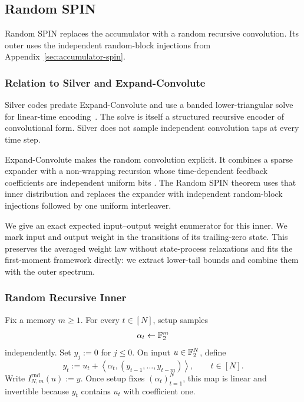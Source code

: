 \subsection{Random SPIN}
\label{sec:random-spin}

Random SPIN replaces the accumulator with a random recursive convolution.
Its outer uses the independent random-block injections from
Appendix~\ref{sec:accumulator-spin}.

\subsubsection{Relation to Silver and Expand-Convolute}

Silver codes predate Expand-Convolute and use a banded lower-triangular solve
for linear-time encoding~\cite{CouteauRindalRaghuraman2021Silver}. The solve
is itself a structured recursive encoder of convolutional form. Silver does
not sample independent convolution taps at every time step.

Expand-Convolute makes the random convolution explicit. It combines a sparse
expander with a non-wrapping recursion whose time-dependent feedback
coefficients are independent uniform bits
\cite{RaghuramanRindalTanguy2023EC}. The Random SPIN theorem uses that
inner distribution and replaces the expander with independent random-block
injections followed by one uniform interleaver.

We give an exact expected input--output weight enumerator
for this inner. We mark input and output weight in the transitions of its
trailing-zero state. This preserves the averaged weight law without
state-process relaxations and fits the first-moment framework directly:
we extract lower-tail bounds and combine them with the outer spectrum.

\subsubsection{Random Recursive Inner}

Fix a memory $m\ge1$. For every $t\in[N]$, setup samples
\[
  \alpha_t\gets\mathbb F_2^m
\]
independently. Set $y_j:=0$ for $j\le0$. On input $u\in\mathbb F_2^N$, define
\begin{equation}
  y_t
  :=
  u_t+
  \left\langle
    \alpha_t,(y_{t-1},\ldots,y_{t-m})
  \right\rangle,
  \qquad t\in[N].
  \label{eq:random-recursive-inner}
\end{equation}
Write $I_{N,m}^{\mathrm{rnd}}(u):=y$. Once setup fixes
$(\alpha_t)_{t=1}^N$, this map is linear and invertible because $y_t$ contains
$u_t$ with coefficient one.

